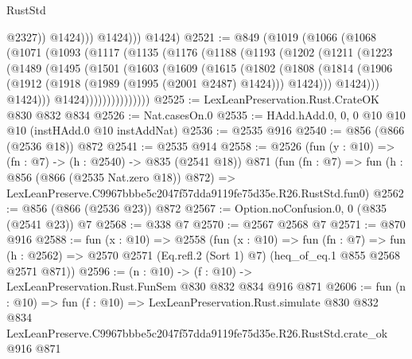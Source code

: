 \begin{lexlean}{RustStd}
\begin{coremodule}
                      @2327))
                  @1424)))
            @1424)))
      @1424)
@2521 := @849
    (@1019
      (@1066
        (@1068
          (@1071
            (@1093
              (@1117
                (@1135
                  (@1176
                    (@1188
                      (@1193
                        (@1202
                          (@1211
                            (@1223
                              (@1489
                                (@1495
                                  (@1501
                                    (@1603
                                      (@1609
                                        (@1615
                                          (@1802
                                            (@1808
                                              (@1814
                                                (@1906
                                                  (@1912
                                                    (@1918 (@1989 (@1995 (@2001 @2487) @1424)))
                                                    @1424)))
                                              @1424)))
                                        @1424)))
                                  @1424)))))))))))))))
@2525 := LexLeanPreservation.Rust.CrateOK @830 @832 @834
@2526 := Nat.casesOn.{0}
@2535 := HAdd.hAdd.{0, 0, 0} @10 @10 @10 (instHAdd.{0} @10 instAddNat)
@2536 := @2535 @916
@2540 := @856 (@866 (@2536 @18)) @872
@2541 := @2535 @914
@2558 := @2526
    (fun (y : @10) => (fn : @7) -> (h : @2540) -> @835 (@2541 @18))
    @871
    (fun (fn : @7) =>
    fun (h : @856 (@866 (@2535 Nat.zero @18)) @872) =>
    LexLeanPreserve.C9967bbbe5c2047f57dda9119fe75d35e.R26.RustStd.fun0)
@2562 := @856 (@866 (@2536 @23)) @872
@2567 := Option.noConfusion.{0, 0} (@835 (@2541 @23)) @7
@2568 := @338 @7
@2570 := @2567 @2568 @7
@2571 := @870 @916
@2588 := fun (x : @10) =>
  @2558
    (fun (x : @10) =>
    fun (fn : @7) =>
    fun (h : @2562) => @2570 @2571 (Eq.refl.{2} (Sort 1) @7) (heq_of_eq.{1} @855 @2568 @2571 @871))
@2596 := (n : @10) -> (f : @10) -> LexLeanPreservation.Rust.FunSem @830 @832 @834 @916 @871
@2606 := fun (n : @10) =>
  fun (f : @10) =>
  LexLeanPreservation.Rust.simulate
    @830
    @832
    @834
    LexLeanPreserve.C9967bbbe5c2047f57dda9119fe75d35e.R26.RustStd.crate_ok
    @916
    @871
\end{coremodule}
\end{lexlean}
